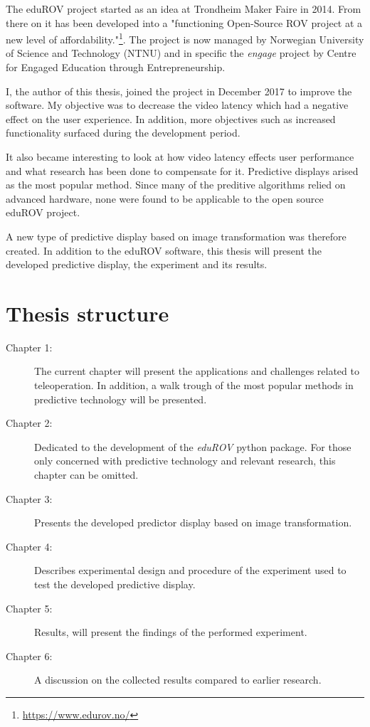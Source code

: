 The eduROV project started as an idea at Trondheim Maker Faire in 2014. From there on it has been developed into a "functioning Open-Source ROV project at a new level of affordability."\footnote{\url{https://www.edurov.no/}}. The project is now managed by Norwegian University of Science and Technology (NTNU) and in specific the \emph{engage} project by Centre for Engaged Education through Entrepreneurship. 

I, the author of this thesis, joined the project in December 2017 to improve the software. My objective was to decrease the video latency which had a negative effect on the user experience. In addition, more objectives such as increased functionality surfaced during the development period.

It also became interesting to look at how video latency effects user performance and what research has been done to compensate for it. Predictive displays arised as the most popular method. Since many of the preditive algorithms relied on advanced hardware, none were found to be applicable to the open source eduROV project.

A new type of predictive display based on image transformation was therefore created. In addition to the eduROV software, this thesis will present the developed predictive display, the experiment and its results.

\section{Thesis structure}

\begin{description}
\item [Chapter 1:] The current chapter will present the applications and challenges related to teleoperation. In addition, a walk trough of the most popular methods in predictive technology will be presented.

\item [Chapter 2:] Dedicated to the development of the \textit{eduROV} python package. For those only concerned with predictive technology and relevant research, this chapter can be omitted.

\item [Chapter 3:] Presents the developed predictor display based on image transformation.

\item [Chapter 4:] Describes experimental design and procedure of the experiment used to test the developed predictive display.

\item [Chapter 5:] Results, will present the findings of the performed experiment.

\item [Chapter 6:] A discussion on the collected results compared to earlier research.
\end{description}


